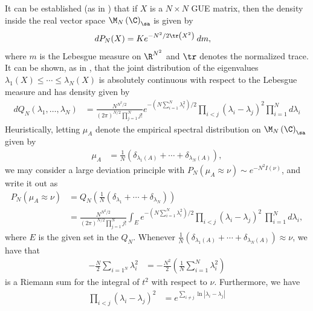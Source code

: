 \documentclass[10pt]{mypackage}
\begin{document}
It can be established (as in \cite[Exercise 1.8]{mingo_and_speicher}) that if $X$ is a $N\times N$ GUE matrix, then the density inside the real vector space $\M_N\left( \C \right)_{\sa}$ is given by
\begin{align*}
  dP_N(X) &= K e^{-N^2/2\tr\left( X^2 \right)}\:dm,
\end{align*}
where $m$ is the Lebesgue measure on $\R^{N^2}$ and $\tr$ denotes the normalized trace. It can be shown, as in \cite[Theorem 2.5.2]{anderson_guionnet_zeitouni}, that the joint distribution of the eigenvalues $\lambda_1(X) \leq\cdots\leq \lambda_N(X)$ is absolutely continuous with respect to the Lebesgue measure and has density given by
\begin{align*}
  dQ_N\left(\lambda_1,\dots,\lambda_N\right) &= \frac{N^{N^2/2}}{\left( 2\pi \right)^{N/2}\prod_{j=1}^{N}j!} e^{-\left( N\sum_{i=1}^{N}\lambda_i^2 \right)/2}\prod_{i < j}\left( \lambda_i - \lambda_j \right)^2 \prod_{i=1}^{N}d\lambda_i
\end{align*}
Heuristically, letting $\mu_A$ denote the empirical spectral distribution on $\M_N\left( \C \right)_{\sa}$ given by
\begin{align*}
  \mu_A &= \frac{1}{N}\left( \delta_{\lambda_1(A)} + \cdots + \delta_{\lambda_N(A)} \right),
\end{align*}
we may consider a large deviation principle with $P_N\left( \mu_A\approx \nu \right)\sim e^{-N^2I\left(\nu\right)}$, and write it out as
\begin{align*}
  P_N\left( \mu_A\approx \nu \right) &= Q_N\left( \frac{1}{N}\left( \delta_{\lambda_1} + \cdots + \delta_{\lambda_N} \right) \right)\\
                                     &= \frac{N^{N^2/2}}{\left( 2\pi \right)^{N/2}\prod_{j=1}^{N}j!} \int_{E}^{} e^{-\left( N\sum_{i=1}^{N}\lambda_i^2 \right)/2}\prod_{i < j}\left( \lambda_i-\lambda_j \right)^2\:\prod_{i=1}^{N}d\lambda_i,
\end{align*}
where $E$ is the given set in the $Q_N$. Whenever $\frac{1}{N}\left( \delta_{\lambda_1(A)} + \cdots + \delta_{\lambda_N(A)} \right) \approx \nu$, we have that
\begin{align*}
  -\frac{N}{2}\sum_{i=1^{N}}\lambda_i^2 &= -\frac{N^2}{2}\left( \frac{1}{N}\sum_{i=1}^{N}\lambda_i^2 \right)
\end{align*}
is a Riemann sum for the integral of $t^2$ with respect to $\nu$. Furthermore, we have
\begin{align*}
  \prod_{i < j}\left( \lambda_i-\lambda_j \right)^2 &= e^{\sum_{i\neq j}\ln\left\vert \lambda_i-\lambda_j \right\vert}
\end{align*}
\end{document}
